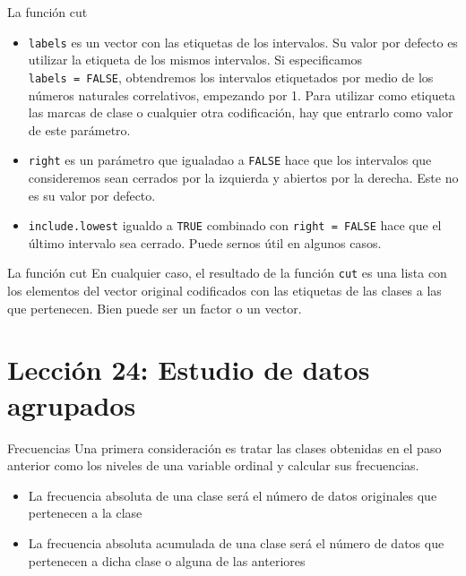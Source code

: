 \documentclass[
  ignorenonframetext,
  aspectratio=169]{beamer}
\providecommand{\tightlist}{%
  \setlength{\itemsep}{0pt}\setlength{\parskip}{0pt}}
\begin{document}
\begin{frame}[fragile]{La función cut}
\label{la-funciuxf3n-cut-1}
\begin{itemize}
\tightlist
\item
  \texttt{labels} es un vector con las etiquetas de los intervalos. Su
  valor por defecto es utilizar la etiqueta de los mismos intervalos. Si
  especificamos \texttt{labels\ =\ FALSE}, obtendremos los intervalos
  etiquetados por medio de los números naturales correlativos, empezando
  por 1. Para utilizar como etiqueta las marcas de clase o cualquier
  otra codificación, hay que entrarlo como valor de este parámetro.
\item
  \texttt{right} es un parámetro que igualadao a \texttt{FALSE} hace que
  los intervalos que consideremos sean cerrados por la izquierda y
  abiertos por la derecha. Este no es su valor por defecto.
\item
  \texttt{include.lowest} igualdo a \texttt{TRUE} combinado con
  \texttt{right\ =\ FALSE} hace que el último intervalo sea cerrado.
  Puede sernos útil en algunos casos.
\end{itemize}
\end{frame}

\begin{frame}[fragile]{La función cut}
\label{la-funciuxf3n-cut-2}
En cualquier caso, el resultado de la función \texttt{cut} es una lista
con los elementos del vector original codificados con las etiquetas de
las clases a las que pertenecen. Bien puede ser un factor o un vector.
\end{frame}

\section{Lección 24: Estudio de datos
agrupados}\label{lecciuxf3n-24-estudio-de-datos-agrupados}

\begin{frame}{Frecuencias}
\label{frecuencias}
Una primera consideración es tratar las clases obtenidas en el paso
anterior como los niveles de una variable ordinal y calcular sus
frecuencias.

\begin{itemize}
\tightlist
\item
  La frecuencia absoluta de una clase será el número de datos originales
  que pertenecen a la clase
\item
  La frecuencia absoluta acumulada de una clase será el número de datos
  que pertenecen a dicha clase o alguna de las anteriores
\end{itemize}
\end{frame}
\end{document}
